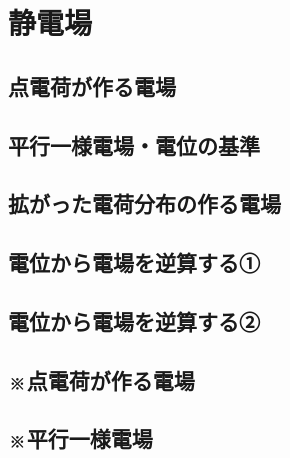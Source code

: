 \documentclass[../../ps_q.tex]{subfiles}
\begin{document}
\section{静電場}

\subsection{点電荷が作る電場}
    

    \vspace{2cm}
    \vfill

\subsection{平行一様電場・電位の基準}
    

    \vspace{2cm}
    \vfill

\subsection{拡がった電荷分布の作る電場}
    

    \vspace{2cm}
    \vfill

\subsection{電位から電場を逆算する①}
    

    \vspace{2cm}
    \vfill

\subsection{電位から電場を逆算する②}
    
    
    \vspace{2cm}
    \vfill

\subsection{※点電荷が作る電場}
    

    \vspace{2cm}
    \vfill

\subsection{※平行一様電場}
    
\end{document}
